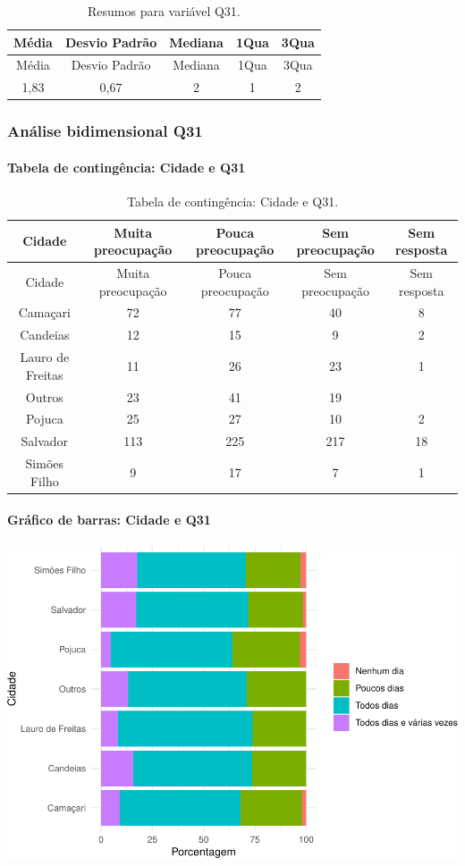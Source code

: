 \documentclass[]{article}
\let\oldparagraph\paragraph
\renewcommand{\paragraph}[1]{\oldparagraph{#1}\mbox{}}
\begin{document}
\begin{longtable}[]{@{}ccccc@{}}
\caption{\label{tab:unnamed-chunk-1014}Resumos para variável Q31.}\tabularnewline
\toprule
Média & Desvio Padrão & Mediana & 1Qua & 3Qua\tabularnewline
\midrule
\endfirsthead
\toprule
Média & Desvio Padrão & Mediana & 1Qua & 3Qua\tabularnewline
\midrule
\endhead
1,83 & 0,67 & 2 & 1 & 2\tabularnewline
\bottomrule
\end{longtable}

\cleardoublepage

\hypertarget{anuxe1lise-bidimensional-q31}{%
\subsubsection{Análise bidimensional Q31}\label{anuxe1lise-bidimensional-q31}}

\hypertarget{tabela-de-continguxeancia-cidade-e-q31}{%
\paragraph{Tabela de contingência: Cidade e Q31}\label{tabela-de-continguxeancia-cidade-e-q31}}

\begin{longtable}[]{@{}ccccc@{}}
\caption{\label{tab:unnamed-chunk-1015}Tabela de contingência: Cidade e Q31.}\tabularnewline
\toprule
Cidade & Muita preocupação & Pouca preocupação & Sem preocupação & Sem resposta\tabularnewline
\midrule
\endfirsthead
\toprule
Cidade & Muita preocupação & Pouca preocupação & Sem preocupação & Sem resposta\tabularnewline
\midrule
\endhead
Camaçari & 72 & 77 & 40 & 8\tabularnewline
Candeias & 12 & 15 & 9 & 2\tabularnewline
Lauro de Freitas & 11 & 26 & 23 & 1\tabularnewline
Outros & 23 & 41 & 19 &\tabularnewline
Pojuca & 25 & 27 & 10 & 2\tabularnewline
Salvador & 113 & 225 & 217 & 18\tabularnewline
Simões Filho & 9 & 17 & 7 & 1\tabularnewline
\bottomrule
\end{longtable}

\hypertarget{gruxe1fico-de-barras-cidade-e-q31}{%
\paragraph{Gráfico de barras: Cidade e Q31}\label{gruxe1fico-de-barras-cidade-e-q31}}

\begin{center}\includegraphics[width=0.75\linewidth]{relatorio_covid19_files/figure-latex/unnamed-chunk-1016-1} \end{center}
\end{document}
